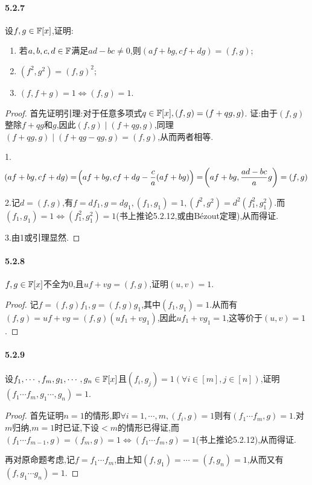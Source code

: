 \documentclass[11pt]{article}
\begin{document}
\paragraph{5.2.7}设$f,g\in\mathbb{F}[x]$,证明:
\begin{enumerate}
    \item 若$a,b,c,d\in \mathbb{F}$满足$ad-bc\neq 0$,则$(af+bg,cf+dg)=(f,g)$;
    \item $(f^2,g^2)=(f,g)^2$;
    \item $(f,f+g)=1\iff (f,g)=1$.
\end{enumerate}
\begin{proof}
    首先证明引理:对于任意多项式$q\in \mathbb{F}[x], (f,g)=(f+qg,g)$. 证:由于$(f,g)$整除$f+qg$和$g$,因此$(f,g)\mid (f+qg,g)$,同理$(f+qg,g)\mid (f+qg-qg,g)=(f,g)$,从而两者相等.

    1. 
    $$\!\left(af+bg,cf+dg\right)=\!\left(af+bg,cf+dg-\frac{c}{a}(af+bg)\right)=\!\left(af+bg,\frac{ad-bc}{a}g\right)=(f,g)$$

    2.记$d=(f,g)$,有$f=df_1, g=dg_1, (f_1,g_1)=1, (f^2,g^2)=d^2(f_1^2,g_1^2)$.而$(f_1,g_1)=1\iff (f_1^2,g_1^2)=1$(书上推论5.2.12,或由Bézout定理),从而得证.

    3.由1或引理显然.
\end{proof}
\paragraph{5.2.8}$f,g\in \mathbb{F}[x]$不全为0,且$uf+vg=(f,g)$,证明$(u,v)=1$.
\begin{proof}
    记$f=(f,g)f_1, g=(f,g)g_1$,其中$(f_1,g_1)=1$.从而有$(f,g)=uf+vg=(f,g)(uf_1+vg_1)$,因此$uf_1+vg_1=1$,这等价于$(u,v)=1$.
\end{proof}
\paragraph{5.2.9}设$f_1,\cdots,f_m,g_1,\cdots,g_n\in \mathbb{F}[x]$且$(f_i,g_j)=1 (\forall i\in [m], j\in [n])$,证明$(f_1\cdots f_m, g_1\cdots, g_n)=1$.
\begin{proof}
    首先证明$n=1$的情形,即$\forall i=1,\cdots,m, (f_i,g)=1$则有$(f_1\cdots f_m,g)=1$.对$m$归纳,$m=1$时已证,下设$<m$的情形已得证,而$(f_1\cdots f_{m-1},g)=(f_m,g)=1\iff (f_1\cdots f_m,g)=1$(书上推论5.2.12),从而得证.

    再对原命题考虑,记$f=f_1\cdots f_m$,由上知$(f,g_1)=\cdots=(f,g_n)=1$,从而又有$(f,g_1\cdots g_n)=1$.
\end{proof}
\end{document}
